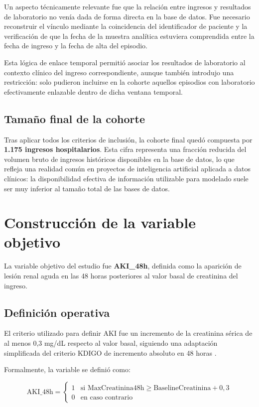 \documentclass[12pt, a4paper, oneside]{report}
\begin{document}
Un aspecto técnicamente relevante fue que la relación entre ingresos y resultados de laboratorio no venía dada de forma directa en la base de datos. Fue necesario reconstruir el vínculo mediante la coincidencia del identificador de paciente y la verificación de que la fecha de la muestra analítica estuviera comprendida entre la fecha de ingreso y la fecha de alta del episodio.

Esta lógica de enlace temporal permitió asociar los resultados de laboratorio al contexto clínico del ingreso correspondiente, aunque también introdujo una restricción: solo pudieron incluirse en la cohorte aquellos episodios con laboratorio efectivamente enlazable dentro de dicha ventana temporal.

\subsection{Tamaño final de la cohorte}

Tras aplicar todos los criterios de inclusión, la cohorte final quedó compuesta por \textbf{1.175 ingresos hospitalarios}. Esta cifra representa una fracción reducida del volumen bruto de ingresos históricos disponibles en la base de datos, lo que refleja una realidad común en proyectos de inteligencia artificial aplicada a datos clínicos: la disponibilidad efectiva de información utilizable para modelado suele ser muy inferior al tamaño total de las bases de datos.

\section{Construcción de la variable objetivo}

La variable objetivo del estudio fue \textbf{AKI\_48h}, definida como la aparición de lesión renal aguda en las 48 horas posteriores al valor basal de creatinina del ingreso.

\subsection{Definición operativa}

El criterio utilizado para definir AKI fue un incremento de la creatinina sérica de al menos 0,3 mg/dL respecto al valor basal, siguiendo una adaptación simplificada del criterio KDIGO de incremento absoluto en 48 horas \parencite{kdigo2012aki}.

Formalmente, la variable se definió como:

\begin{equation}
\text{AKI\_48h} = 
\begin{cases}
1 & \text{si } \text{MaxCreatinina48h} \geq \text{BaselineCreatinina} + 0{,}3 \\
0 & \text{en caso contrario}
\end{cases}
\end{equation}
\end{document}
